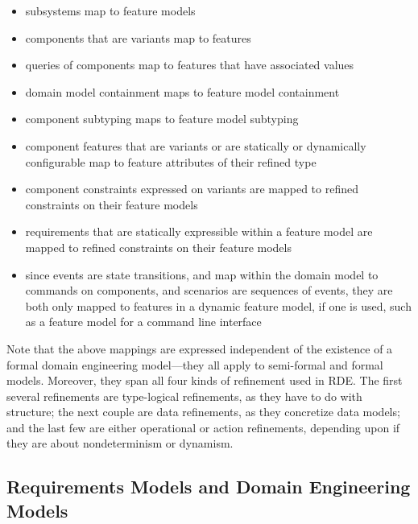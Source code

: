 \documentclass[10pt,letterpaper]{article}
\begin{document}
\begin{itemize}

    \item subsystems map to feature models

    \item components that are variants map to features

    \item queries of components map to features that have associated values

    \item domain model containment maps to feature model containment

    \item component subtyping maps to feature model subtyping

    \item component features that are variants or are statically or dynamically configurable map to feature attributes of their refined type

    \item component constraints expressed on variants are mapped to refined constraints on their feature models

    \item requirements that are statically expressible within a feature model are mapped to refined constraints on their feature models

    \item since events are state transitions, and map within the domain model to commands on components, and scenarios are sequences of events, they are both only mapped to features in a dynamic feature model, if one is used, such as a feature model for a command line interface

\end{itemize}

Note that the above mappings are expressed independent of the existence of a formal domain engineering model---they all apply to semi-formal and formal models. Moreover, they span all four kinds of refinement used in RDE. The first several refinements are type-logical refinements, as they have to do with structure; the next couple are data refinements, as they concretize data models; and the last few are either operational or action refinements, depending upon if they are about nondeterminism or dynamism.

\subsection{Requirements Models and Domain Engineering Models}
\label{requirements-models-and-domain-engineering-models}
\end{document}
